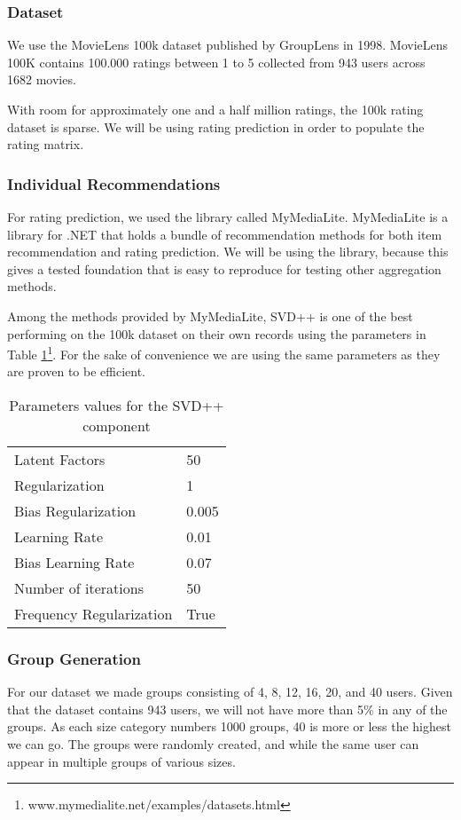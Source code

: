 \subsubsection{Dataset}\label{sec:dataset}
We use the MovieLens 100k dataset published by GroupLens in 1998\cite{movielens100k}. MovieLens 100K contains 100.000 ratings between 1 to 5 collected from 943 users across 1682 movies.

With room for approximately one and a half million ratings, the 100k rating dataset is sparse. We will be using rating prediction in order to populate the rating matrix.

\subsubsection{Individual Recommendations}\label{sec:individualrecommendation}
For rating prediction, we used the library called MyMediaLite\cite{mymedialite}. MyMediaLite is a library for .NET that holds a bundle of recommendation methods for both item recommendation and rating prediction. We will be using the library, because this gives a tested foundation that is easy to reproduce for testing other aggregation methods.

Among the methods provided by MyMediaLite, SVD++ is one of the best performing on the 100k dataset on their own records using the parameters in Table \ref{tbl:svdpp}\footnote{www.mymedialite.net/examples/datasets.html}. For the sake of convenience we are using the same parameters as they are proven to be efficient. 
\begin{table}[H]
	\centering
	\begin{tabular}{|l|l|}\hline
		Latent Factors & 50 \\
		Regularization & 1	\\
		Bias Regularization & 0.005	\\
		Learning Rate & 0.01 \\
		Bias Learning Rate & 0.07 \\ 
		Number of iterations & 50 \\
		Frequency Regularization & True \\\hline
	\end{tabular}
	\caption{Parameters values for the SVD++ component}
	\label{tbl:svdpp}
\end{table}

\subsubsection{Group Generation}\label{sec:groupgeneration}
For our dataset we made groups consisting of 4, 8, 12, 16, 20, and 40 users. Given that the dataset contains 943 users, we will not have more than 5\% in any of the groups. As each size category numbers 1000 groups, 40 is more or less the highest we can go. The groups were randomly created, and while the same user can appear in multiple groups of various sizes.